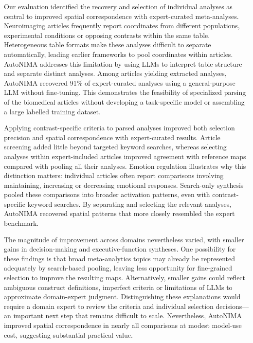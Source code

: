 Our evaluation identified the recovery and selection of individual analyses as central to improved spatial correspondence with expert-curated meta-analyses. Neuroimaging articles frequently report coordinates from different populations, experimental conditions or opposing contrasts within the same table. Heterogeneous table formats make these analyses difficult to separate automatically, leading earlier frameworks to pool coordinates within articles. AutoNIMA addresses this limitation by using LLMs to interpret table structure and separate distinct analyses. Among articles yielding extracted analyses, AutoNIMA recovered 91\% of expert-curated analyses using a general-purpose LLM without fine-tuning. This demonstrates the feasibility of specialized parsing of the biomedical articles without developing a task-specific model or assembling a large labelled training dataset.

Applying contrast-specific criteria to parsed analyses improved both selection precision and spatial correspondence with expert-curated results. Article screening added little beyond targeted keyword searches, whereas selecting analyses within expert-included articles improved agreement with reference maps compared with pooling all their analyses. Emotion regulation illustrates why this distinction matters: individual articles often report comparisons involving maintaining, increasing or decreasing emotional responses\cite{Elliott2014-tu,Morawetz2025-ow}. Search-only synthesis pooled these comparisons into broader activation patterns, even with contrast-specific keyword searches. By separating and selecting the relevant analyses, AutoNIMA recovered spatial patterns that more closely resembled the expert benchmark.

The magnitude of improvement across domains nevertheless varied, with smaller gains in decision-making and executive-function syntheses. One possibility for these findings is that broad meta-analytics topics may already be represented adequately by search-based pooling, leaving less opportunity for fine-grained selection to improve the resulting maps. Alternatively, smaller gains could reflect ambiguous construct definitions\cite{Poldrack2015-pd}, imperfect criteria or limitations of LLMs to approximate domain-expert judgment. Distinguishing these explanations would require a domain expert to review the criteria and individual selection decisions---an important next step that remains difficult to scale. Nevertheless, AutoNIMA improved spatial correspondence in nearly all comparisons at modest model-use cost, suggesting substantial practical value.

